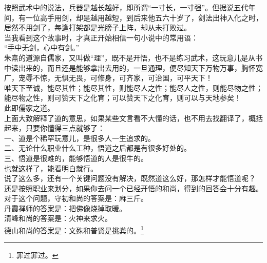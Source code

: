 \begin{multicols}{\theparacolNo}
按照武术中的说法，兵器是越长越好，即所谓“一寸长，一寸强”。但据说五代年间，有一位高手用剑，却是越用越短，到后来他五六十岁了，剑法出神入化之时，居然不用剑了，每逢打架都是光膀子上阵，却从未打败过。\\

当我看到这个故事时，才真正开始相信一句小说中的常用语：\\

“手中无剑，心中有剑。”\\

朱熹的道源自儒家，又叫做“理”，既不是开悟，也不是练习武术，这玩意儿是从书中读出来的，而且还是能够拿出去用的，一旦通理，便尽知天下万物万事，胸怀宽广，宠辱不惊，无惧无畏，可修身，可齐家，可治国，可平天下！\\

唯天下至诚，能尽其性；能尽其性，则能尽人之性；能尽人之性，则能尽物之性；能尽物之性，则可赞天下之化育；可以赞天下之化育，则可以与天地参矣！\\

此即儒家之道。\\

上面大致解释了道的意思，如果某些文言看不大懂的话，也不用去找翻译了，概括起来，只要你懂得三点就够了：\\

一、道是个稀罕玩意儿，是很多人一生追求的。\\

二、无论什么职业什么工种，悟道之后都是有很多好处的。\\

三、悟道是很难的，能够悟道的人是很牛的。\\

也就这样了，能看明白就行。\\

说了这么多，还有一个关键问题没有解决，既然道这么好，那怎样才能悟道呢？\\

还是按照职业来划分，如果你去问一个已经开悟的和尚，得到的回答会十分有趣。\\

对于这个问题，守初和尚的答案是：麻三斤。\\

丹霞禅师的答案是：把佛像烧掉取暖。\\

清峰和尚的答案是：火神来求火。\\

德山和尚的答案是：文殊和普贤是挑粪的。\footnote{罪过罪过。}\\


\end{multicols}
